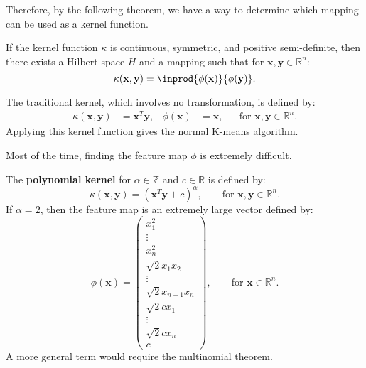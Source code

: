 \documentclass{huhtakm-template-book-v2}
\begin{document}
    Therefore, by the following theorem, we have a way to determine which mapping can be used as a kernel function.
    \begin{thm}
        If the kernel function $\kappa$ is continuous, symmetric, and positive semi-definite, then there exists a Hilbert space $H$ and a mapping such that for $\mathbf{x},\mathbf{y}\in\mathbb{R}^{n}$:
        \begin{equation*}
            \kappa(\mathbf{x},\mathbf{y})=\inprod{\phi(\mathbf{x})}{\phi(\mathbf{y})}.
        \end{equation*}
    \end{thm}
    \begin{eg}
        The traditional kernel, which involves no transformation, is defined by:
        \begin{align*}
            \kappa(\mathbf{x},\mathbf{y})&=\mathbf{x}^{T}\mathbf{y}, & \phi(\mathbf{x})&=\mathbf{x}, & &\text{for } \mathbf{x},\mathbf{y}\in\mathbb{R}^{n}.
        \end{align*}
        Applying this kernel function gives the normal K-means algorithm.
    \end{eg}
    \begin{rem}
        Most of the time, finding the feature map $\phi$ is extremely difficult.
    \end{rem}
    \begin{eg}
        The \textbf{polynomial kernel} for $\alpha\in\mathbb{Z}$ and $c\in\mathbb{R}$ is defined by:
        \begin{equation*}
            \kappa(\mathbf{x},\mathbf{y})=(\mathbf{x}^{T}\mathbf{y}+c)^{\alpha}, \qquad \text{for }\mathbf{x},\mathbf{y}\in \mathbb{R}^{n}.
        \end{equation*}
        If $\alpha = 2$, then the feature map is an extremely large vector defined by:
        \begin{equation*}
            \phi(\mathbf{x})=\begin{pmatrix}
                x_{1}^{2}\\
                \vdots\\
                x_{n}^{2}\\
                \sqrt{2}x_{1}x_{2}\\
                \vdots\\
                \sqrt{2}x_{n-1}x_{n}\\
                \sqrt{2}cx_{1}\\
                \vdots\\
                \sqrt{2}cx_{n}\\
                c
            \end{pmatrix}, \qquad \text{for }\mathbf{x}\in\mathbb{R}^{n}.
        \end{equation*}
        A more general term would require the multinomial theorem.
    \end{eg}
\end{document}
